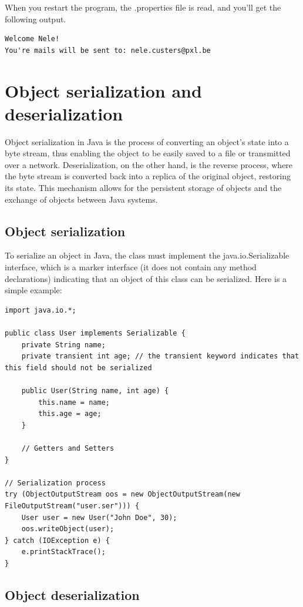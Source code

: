 When you restart the program, the .properties file is read, and you'll get the following output.

\begin{verbatim}
Welcome Nele!
You're mails will be sent to: nele.custers@pxl.be
\end{verbatim}


\section{Object serialization and deserialization}

Object serialization in Java is the process of converting an object's state into a byte stream, thus enabling the object to be easily saved to a file or transmitted over a network. Deserialization, on the other hand, is the reverse process, where the byte stream is converted back into a replica of the original object, restoring its state. This mechanism allows for the persistent storage of objects and the exchange of objects between Java systems.

\subsection{Object serialization}
To serialize an object in Java, the class must implement the java.io.Serializable interface, which is a marker interface (it does not contain any method declarations) indicating that an object of this class can be serialized. Here is a simple example:

\begin{lstlisting}
import java.io.*;

public class User implements Serializable {
    private String name;
    private transient int age; // the transient keyword indicates that this field should not be serialized

    public User(String name, int age) {
        this.name = name;
        this.age = age;
    }
    
    // Getters and Setters
}

// Serialization process
try (ObjectOutputStream oos = new ObjectOutputStream(new FileOutputStream("user.ser"))) {
    User user = new User("John Doe", 30);
    oos.writeObject(user);
} catch (IOException e) {
    e.printStackTrace();
}
\end{lstlisting}

\subsection{Object deserialization}


